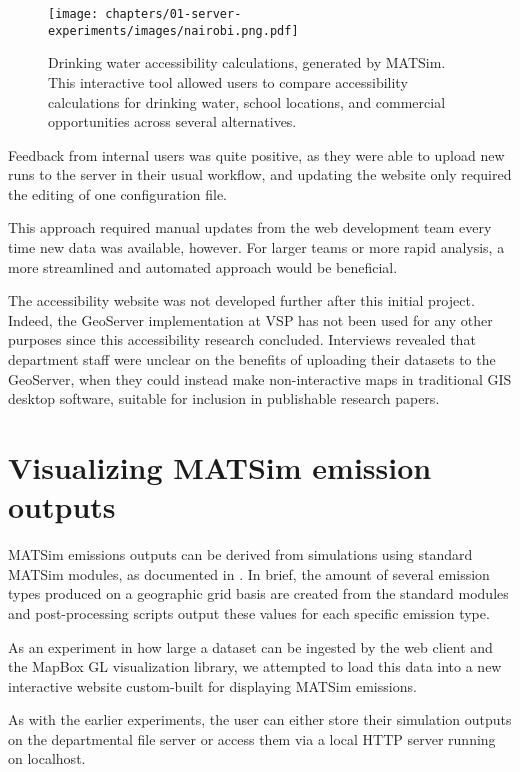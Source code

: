 \begin{figure}[!ht]
  \texttt{[image: chapters/01-server-experiments/images/nairobi.png.pdf]}
  \caption{Drinking water accessibility calculations, generated by MATSim. This interactive tool allowed users to compare accessibility calculations for drinking water, school locations, and commercial opportunities across several alternatives.}
  \label{fig:nairobi}
\end{figure}

Feedback from internal users was quite positive, as they were able to upload new runs to the server in their usual workflow, and updating the website only required the editing of one configuration file.

This approach required manual updates from the web development team every time new data was available, however. For larger teams or more rapid analysis, a more streamlined and automated approach would be beneficial.

The accessibility website was not developed further after this initial project. Indeed, the GeoServer implementation at VSP has not been used for any other purposes since this accessibility research concluded. Interviews revealed that department staff were unclear on the benefits of uploading their datasets to the GeoServer, when they could instead make non-interactive maps in traditional GIS desktop software, suitable for inclusion in publishable research papers.

\hypertarget{server-experiments-emissions}{%
\section{Visualizing MATSim emission outputs}
\label{server-experiments-emissions}}

MATSim emissions outputs can be derived from simulations using standard MATSim modules, as documented in \cite{Kickhoefer2015EmissionModeling}. In brief, the amount of several emission types produced on a geographic grid basis are created from the standard modules and post-processing scripts output these values for each specific emission type.

As an experiment in how large a dataset can be ingested by the web client and the MapBox GL visualization library, we attempted to load this data into a new interactive website custom-built for displaying MATSim emissions.

As with the earlier experiments, the user can either store their simulation outputs on the departmental file server or access them via a local HTTP server running on localhost.


